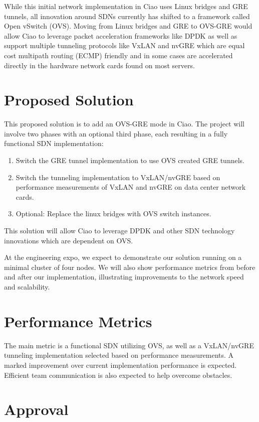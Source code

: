 \documentclass[10pt,letterpaper,onecolumn,draftclsnofoot]{IEEEtran}
\begin{document}
While this initial network implementation in Ciao uses Linux bridges and GRE tunnels, all innovation around SDNs currently has shifted to a framework called Open vSwitch (OVS). Moving from Linux bridges and GRE to OVS-GRE would allow Ciao to leverage packet acceleration frameworks like DPDK as well as support multiple tunneling protocols like VxLAN and nvGRE which are equal cost multipath routing (ECMP) friendly and in some cases are accelerated directly in the hardware network cards found on most servers.
\section*{Proposed Solution}
This proposed solution is to add an OVS-GRE mode in Ciao. The project will involve two phases with an optional third phase, each resulting in a fully functional SDN implementation:

\begin{enumerate}
	\item Switch the GRE tunnel implementation to use OVS created GRE tunnels.
	\item Switch the tunneling implementation to VxLAN/nvGRE based on performance measurements of VxLAN and nvGRE on data center network cards.
	\item Optional: Replace the linux bridges with OVS switch instances.
\end{enumerate}
This solution will allow Ciao to leverage DPDK and other SDN technology innovations which are dependent on OVS.

At the engineering expo, we expect to demonstrate our solution running on a minimal cluster of four nodes. We will also show performance metrics from before and after our implementation, illustrating improvements to the network speed and scalability.

\section*{Performance Metrics}
The main metric is a functional SDN utilizing OVS, as well as a VxLAN/nvGRE tunneling implementation selected based on performance measurements. A marked improvement over current implementation performance is expected. Efficient team communication is also expected to help overcome obstacles.

\clearpage
\section*{Approval}
\end{document}
